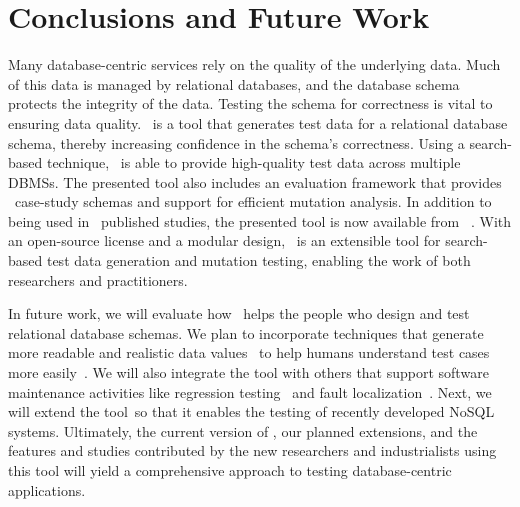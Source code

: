 
\section{Conclusions and Future Work}\label{sec:conclusion}


Many database-centric services rely on the quality of the underlying data. Much of this data is managed by relational
databases, and the database schema protects the integrity of the data. Testing the schema for correctness is vital to
ensuring data quality. \sa~is a tool that generates test data for a relational database schema, thereby increasing
confidence in the schema's correctness.  Using a search-based technique, \sa~is able to provide high-quality test data
across multiple DBMSs. The presented tool also includes an evaluation framework that provides
\numprovidedschemas~case-study schemas and support for efficient mutation analysis. In addition to being used in
\numuniquepapers~published studies, the presented tool is now available from \sawebsite~\cite{tool}. With an open-source
license and a modular design, \sa~is an extensible tool for search-based test data generation and mutation testing,
enabling the work of both researchers and practitioners.


In future work, we will evaluate how \sa~helps the people who design and test relational database schemas.  We plan to
incorporate techniques that generate more readable and realistic data
values~\cite{Afshan2013,McMinn2012,Shahbaz2012,Shahbaz2015} to help humans understand test cases more
easily~\cite{Fraser2015, Fraser2013}.  We will also integrate the tool with others that support software maintenance
activities like regression testing~\cite{Kapfhammer2008} and fault localization~\cite{Clark2011}. Next, we will extend
the tool~so that it enables the testing of recently developed NoSQL systems. Ultimately, the current version of \sa, our
planned extensions, and the features and studies contributed by the new researchers and industrialists using this tool
will yield a comprehensive approach to testing database-centric applications.

